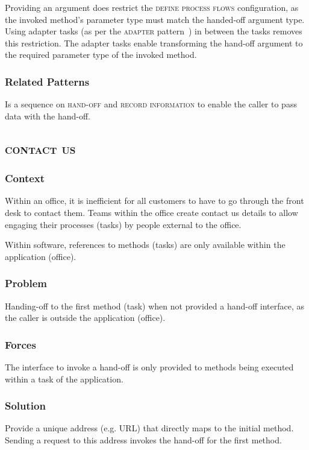 \documentclass[prodmode]{style/acmlarge}
\begin{document}
Providing an argument does restrict the \textsc{define process flows}
configuration, as the invoked method's parameter type must match the handed-off
argument type.  Using adapter tasks (as per the \textsc{adapter}
pattern~\cite{gof}) in between the tasks removes this restriction.  The adapter
tasks enable transforming the hand-off argument to the required parameter type
of the invoked method.

\subsubsection*{Related Patterns} Is a sequence on \textsc{hand-off} and
\textsc{record information} to enable the caller to pass data with the hand-off.



\subsection{\textsc{\textbf{contact us}}}

\subsubsection*{Context} Within an office, it is inefficient for all customers
to have to go through the front desk to contact them.  Teams within the office
create contact us details to allow engaging their processes (tasks) by people
external to the office.

Within software, references to methods (tasks) are only available within the
application (office).

\subsubsection*{\textbf{Problem}} Handing-off to the first method (task) when not
provided a hand-off interface, as the caller is outside the application
(office).

\subsubsection*{Forces} The interface to invoke a hand-off is only provided to
methods being executed within a task of the application.

\subsubsection*{\textbf{Solution}} Provide a unique address (e.g. URL) that directly maps
to the initial method.  Sending a request to this address invokes the hand-off
for the first method.
\end{document}
